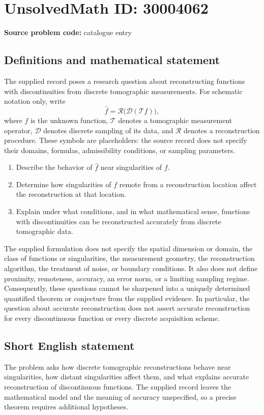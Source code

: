 \documentclass[11pt]{article}
\begin{document}
\section*{UnsolvedMath ID: 30004062}
\textbf{Source problem code:} catalogue entry
\subsection{Definitions and mathematical statement}
The supplied record poses a research question about reconstructing functions with discontinuities from discrete tomographic measurements. For schematic notation only, write
\[
\widehat f=\mathcal R\bigl(\mathcal D(\mathcal T f)\bigr),
\]
where \(f\) is the unknown function, \(\mathcal T\) denotes a tomographic measurement operator, \(\mathcal D\) denotes discrete sampling of its data, and \(\mathcal R\) denotes a reconstruction procedure. These symbols are placeholders: the source record does not specify their domains, formulas, admissibility conditions, or sampling parameters.

\begin{enumerate}
\item Describe the behavior of \(\widehat f\) near singularities of \(f\).
\item Determine how singularities of \(f\) remote from a reconstruction location affect the reconstruction at that location.
\item Explain under what conditions, and in what mathematical sense, functions with discontinuities can be reconstructed accurately from discrete tomographic data.
\end{enumerate}

The supplied formulation does not specify the spatial dimension or domain, the class of functions or singularities, the measurement geometry, the reconstruction algorithm, the treatment of noise, or boundary conditions. It also does not define proximity, remoteness, accuracy, an error norm, or a limiting sampling regime. Consequently, these questions cannot be sharpened into a uniquely determined quantified theorem or conjecture from the supplied evidence. In particular, the question about accurate reconstruction does not assert accurate reconstruction for every discontinuous function or every discrete acquisition scheme.
\subsection{Short English statement}
The problem asks how discrete tomographic reconstructions behave near singularities, how distant singularities affect them, and what explains accurate reconstruction of discontinuous functions. The supplied record leaves the mathematical model and the meaning of accuracy unspecified, so a precise theorem requires additional hypotheses.
\end{document}
